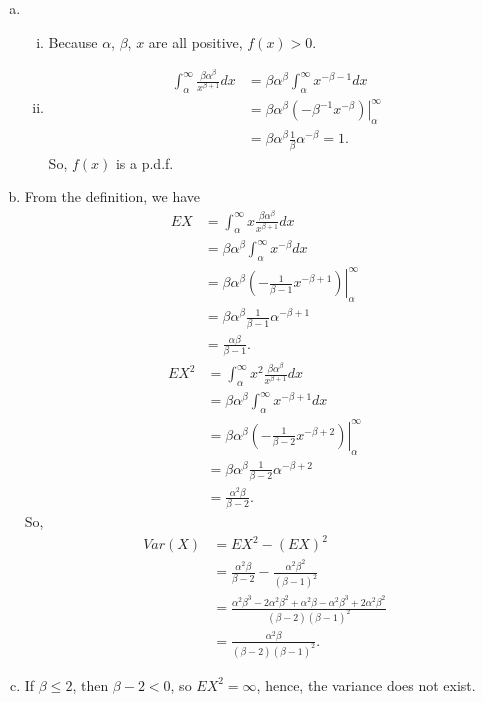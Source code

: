 \documentclass[14pt]{elegantbook}
\begin{document}
    \begin{solution}
        \begin{enumerate}[(a)]
            \item \begin{enumerate}[i)]
                \item Because $\alpha$, $\beta$, $x$ are all positive, $f(x)>0$. 
                \item \begin{align*}
                    \int_\alpha^\infty \frac{\beta\alpha^\beta}{x^{\beta+1}}dx&=\beta\alpha^\beta\int_\alpha^\infty x^{-\beta-1}dx\\
                    &=\beta\alpha^\beta\left.(-\beta^{-1}x^{-\beta})\right|_\alpha^\infty\\
                    &=\beta\alpha^\beta\frac{1}{\beta}\alpha^{-\beta}=1. 
                \end{align*}
                So, $f(x)$ is a p.d.f.
            \end{enumerate}
            \item From the definition, we have
            \begin{align*}
                EX&=\int_\alpha^\infty x\frac{\beta\alpha^\beta}{x^{\beta+1}}dx\\
                &=\beta\alpha^\beta\int_\alpha^\infty x^{-\beta}dx\\
                &=\beta\alpha^\beta\left.\left(-\frac{1}{\beta-1}x^{-\beta+1}\right)\right|_\alpha^\infty\\
                &=\beta\alpha^\beta\frac{1}{\beta-1}\alpha^{-\beta+1}\\
                &=\frac{\alpha\beta}{\beta-1}.
            \end{align*}
            \begin{align*}
                EX^2&=\int_\alpha^\infty x^2\frac{\beta\alpha^\beta}{x^{\beta+1}}dx\\
                &=\beta\alpha^\beta\int_\alpha^\infty x^{-\beta+1}dx\\
                &=\beta\alpha^\beta\left.\left(-\frac{1}{\beta-2}x^{-\beta+2}\right)\right|_\alpha^\infty\\
                &=\beta\alpha^\beta\frac{1}{\beta-2}\alpha^{-\beta+2}\\
                &=\frac{\alpha^2\beta}{\beta-2}. 
            \end{align*}
            So, 
            \begin{align*}
                Var(X)&=EX^2-(EX)^2\\
                &=\frac{\alpha^2\beta}{\beta-2}-\frac{\alpha^2\beta^2}{(\beta-1)^2}\\
                &=\frac{\alpha^2\beta^3-2\alpha^2\beta^2+\alpha^2\beta-\alpha^2\beta^3+2\alpha^2\beta^2}{(\beta-2)(\beta-1)^2}\\
                &=\frac{\alpha^2\beta}{(\beta-2)(\beta-1)^2}. 
            \end{align*}
            \item If $\beta\leq2$, then $\beta-2<0$, so $EX^2=\infty$, hence, the variance does not exist.
        \end{enumerate}
    \end{solution}
\end{document}
